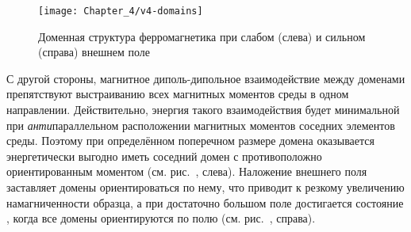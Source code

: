%

\begin{wrapfigure}[]{r}{0.4\textwidth}
    \centering\texttt{[image: Chapter\_4/v4-domains]}
    \caption{Доменная структура ферромагнетика при слабом (слева)
    и сильном (справа) внешнем поле}
\end{wrapfigure}

С другой стороны, магнитное диполь-дипольное взаимодействие между доменами препятствуют
выстраиванию всех магнитных моментов среды в одном направлении.
Действительно, энергия такого взаимодействия будет минимальной
при \emph{анти}параллельном расположении магнитных моментов соседних элементов среды.
Поэтому при определённом поперечном размере домена оказывается
энергетически выгодно иметь соседний домен с противоположно ориентированным моментом
(см. рис.~, слева).
Наложение внешнего поля заставляет домены ориентироваться
по нему, что приводит к резкому увеличению намагниченности образца, а при
достаточно большом поле достигается состояние ,
когда все домены ориентируются по полю (см. рис.~, справа).


